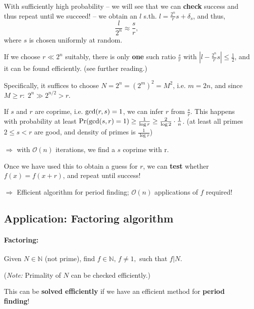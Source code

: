 \documentclass[a4paper, 12pt]{article}
\theoremstyle{plain}
\theoremstyle{definition}
\theoremstyle{remark}
\begin{document}
With sufficiently high probability -- we will see that we can \textbf{check} success and thus repeat until we succeed! -- we obtain an $l$ s.th. $l=\frac{2^n}{r}s+\delta_s$, and thus,
\begin{equation*}
  \frac{l}{2^n} \approx \frac{s}{r},
\end{equation*}
where $s$ is chosen uniformly at random.

If we choose $r\ll2^n$ suitably, there is only \textbf{one} such ratio $\frac{s}{r}$ with $|l-\frac{2^n}{r}s| \leq \frac{1}{2}$, and it can be found efficiently. (see further reading.)

Specifically, it suffices to choose $N=2^n=(2^m)^2=M^2$, i.e. $m=2n$, and since $M\geq r:\; 2^n \gg 2^{n/2} > r.  $

If $s$ and $r$ are coprime, i.e. $\textnormal{gcd}(r,s)=1$, we can infer $r$ from $\frac{s}{r}$. This happens with probability at least $\Pr(\textnormal{gcd}(s,r)=1) \geq \frac{1}{\log r} \geq \frac{2}{\log 2}\cdot \frac{1}{n}$. (at least all primes $2\leq s < r$ are good, and density of primes is $\frac{1}{\log r}$)

$\Longrightarrow$ with $\mathcal{O}(n)$ iterations, we find a $s$ coprime with r.

Once we have used this to obtain a guess for $r$, we can \textbf{test} whether $f(x)=f(x+r)$, and repeat until success!

$\Longrightarrow$ Efficient algorithm for period finding; $\mathcal{O}(n)$ applications of $f$ required!

\subsection{Application: Factoring algorithm}

\paragraph{Factoring:} Given $N\in\mathbb{N}$ (not prime), find $f \in \mathbb{N},\, f\neq1,$ such that $f|N$.

(\emph{Note:} Primality of $N$ can be checked efficiently.)

This can be \textbf{solved efficiently} if we have an efficient method for \textbf{period finding}!
\end{document}
